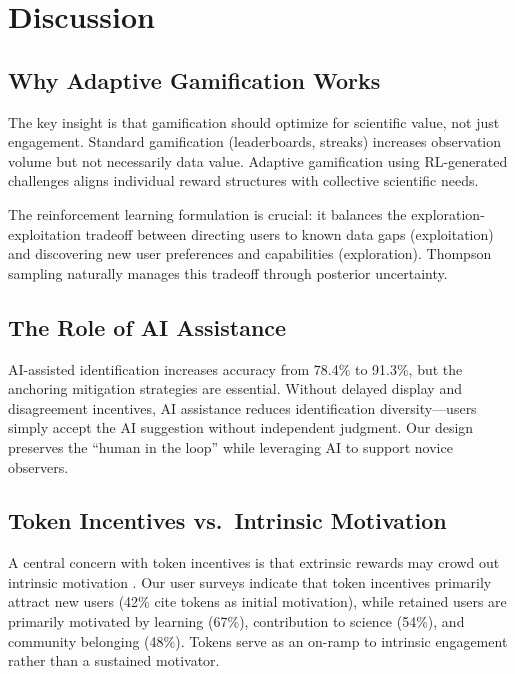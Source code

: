 \section{Discussion}

\label{sec:discussion}

\subsection{Why Adaptive Gamification Works}

The key insight is that gamification should optimize for scientific value,
not just engagement. Standard gamification (leaderboards, streaks)
increases observation volume but not necessarily data value. Adaptive
gamification using RL-generated challenges aligns individual reward
structures with collective scientific needs.

The reinforcement learning formulation is crucial: it balances the
exploration-exploitation tradeoff between directing users to known data
gaps (exploitation) and discovering new user preferences and capabilities
(exploration). Thompson sampling naturally manages this tradeoff through
posterior uncertainty.

\subsection{The Role of AI Assistance}

AI-assisted identification increases accuracy from 78.4\% to 91.3\%,
but the anchoring mitigation strategies are essential. Without delayed
display and disagreement incentives, AI assistance reduces identification
diversity---users simply accept the AI suggestion without independent
judgment. Our design preserves the ``human in the loop'' while leveraging
AI to support novice observers.

\subsection{Token Incentives vs.\ Intrinsic Motivation}

A central concern with token incentives is that extrinsic rewards may
crowd out intrinsic motivation \citep{deci1999meta}. Our user surveys
indicate that token incentives primarily attract new users (42\% cite
tokens as initial motivation), while retained users are primarily
motivated by learning (67\%), contribution to science (54\%), and
community belonging (48\%). Tokens serve as an on-ramp to intrinsic
engagement rather than a sustained motivator.


